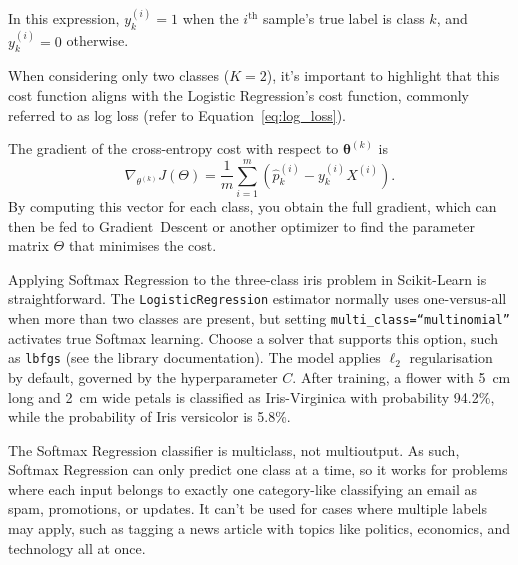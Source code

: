 \documentclass[12pt,letter]{article}
\begin{document}
\begin{mdframed}[middlelinewidth=0.5mm]
\begin{center}
\end{center}
In this expression, $y_k^{(i)} = 1$ when the $i^\text{th}$ sample's true label is class $k$, and $y_k^{(i)} = 0$ otherwise.
\end{mdframed}
When considering only two classes ($K = 2$), it's important to highlight that this cost function aligns with the Logistic Regression's cost function, commonly referred to as log loss (refer to Equation~\ref{eq:log_loss}).

The gradient of the cross-entropy cost with respect to $\boldsymbol{\theta}^{(k)}$ is
\begin{equation}
\nabla_{\theta^{(k)}}J(\Theta) = \frac{1}{m} \sum_{i=1}^{m} (\hat{p}_k^{(i)}-y_k^{(i)} X^{(i)}).
\end{equation}
By computing this vector for each class, you obtain the full gradient, which can then be fed to Gradient~Descent or another optimizer to find the parameter matrix $\Theta$ that minimises the cost.




Applying Softmax Regression to the three-class iris problem in Scikit-Learn is straightforward. The \texttt{LogisticRegression} estimator normally uses one-versus-all when more than two classes are present, but setting \texttt{multi\_class=``multinomial''} activates true Softmax learning. Choose a solver that supports this option, such as \texttt{lbfgs} (see the library documentation). The model applies $\ell_{2}$ regularisation by default, governed by the hyperparameter $C$. After training, a flower with 5~cm long and 2~cm wide petals is classified as Iris-Virginica with probability 94.2\%, while the probability of Iris versicolor is 5.8\%.


\begin{mdframed}[middlelinewidth=0.5mm]
\begin{center}
\end{center}
The Softmax Regression classifier is multiclass, not multioutput. As such, Softmax Regression can only predict one class at a time, so it works for problems where each input belongs to exactly one category-like classifying an email as spam, promotions, or updates. It can't be used for cases where multiple labels may apply, such as tagging a news article with topics like politics, economics, and technology all at once.
\end{mdframed}
\end{document}
